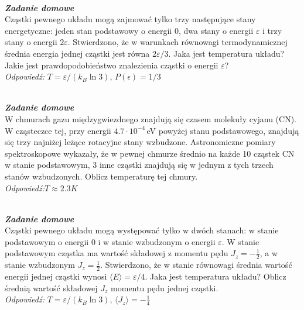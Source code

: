 \documentclass[11pt,a4paper]{article}
\newcounter{zaddom}\newcommand{\zaddom}[1][]{\addtocounter{zaddom}{1} ~\\  {\bf \emph{Zadanie domowe \arabic{zaddom} #1 }} \\}
\begin{document}

%
%

\zaddom
Cząstki pewnego układu mogą zajmować tylko trzy następujące stany energetyczne:\linebreak
jeden stan podstawowy o energii 0, dwa stany o energii $\varepsilon$
 i trzy stany o energii $2\varepsilon$. Stwierdzono, że
w warunkach równowagi termodynamicznej średnia energia jednej cząstki
jest równa $2\varepsilon/3$.
Jaka jest temperatura układu?
Jakie jest prawdopodobieństwo znalezienia cząstki o energii $\varepsilon$?
\\
\textit{Odpowiedź:} $T=\varepsilon/(k_B  \ln 3), \, P(\epsilon)=1/3$

\zaddom
W chmurach gazu międzygwiezdnego znajdują się czasem molekuły cyjanu (CN). W cząsteczce
tej, przy energii $4.7 \cdot 10^{-4}$\,eV powyżej stanu podstawowego, znajdują się trzy najniżej leżące
rotacyjne stany wzbudzone. Astronomiczne pomiary spektroskopowe wykazały, że w pewnej
chmurze średnio na każde 10 cząstek CN w stanie podstawowym, 3 inne cząstki znajdują się w
jednym z tych trzech stanów wzbudzonych. Oblicz temperaturę tej chmury.
\\
\textit{Odpowiedź:}$T\approx 2.3 K$

\zaddom
Cząstki pewnego układu mogą występować tylko w dwóch stanach:
w stanie podstawowym o energii 0 i w stanie wzbudzonym o energii $\varepsilon$.
W stanie podstawowym cząstka ma wartość składowej z momentu pędu $J_z=-\frac{1}{2}$, a w stanie wzbudzonym $J_z=\frac{1}{2}$.
Stwierdzono, że w stanie równowagi średnia wartość energii jednej cząstki wynosi $\langle E\rangle = \varepsilon/4$. Jaka jest temperatura układu?
Oblicz średnią wartość składowej $J_z$ momentu pędu jednej cząstki.
\\
\textit{Odpowiedź:} $T=\varepsilon/(k_B \ln 3), \, \langle J_z \rangle = -\frac{1}{4}$
\end{document}

